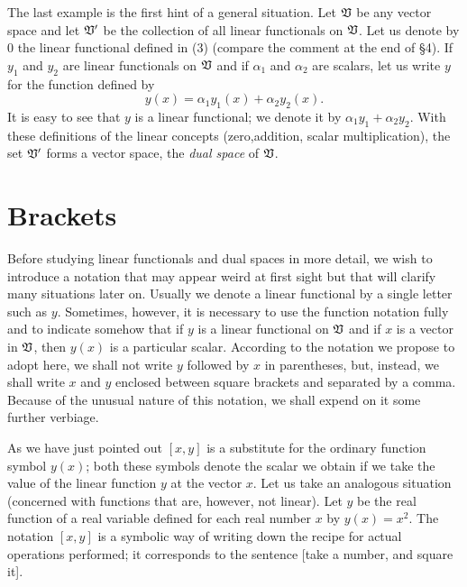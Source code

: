 The last example is the first hint of a general situation. Let \(\mathfrak{V}\) be any
vector space and let \(\mathfrak{V}'\) be the collection of all linear functionals on
\(\mathfrak{V}\). Let us denote by \(0\) the linear functional defined in (3) (compare
the comment at the end of §4). If \(y_1\) and \(y_2\) are linear functionals on
\(\mathfrak{V}\) and if \(\alpha_1\) and \(\alpha_2\) are scalars, let us write \(y\)
for the function defined by
\begin{equation*}
    y(x) = \alpha_1 y_1(x) + \alpha_2 y_2(x).
\end{equation*}
It is easy to see that \(y\) is a linear functional; we denote it by \(\alpha_1
y_1 + \alpha_2 y_2\). With these definitions of the linear concepts
(zero,addition, scalar multiplication), the set \(\mathfrak{V}'\) forms a vector space,
the \emph{dual space} of \(\mathfrak{V}\).

\section{Brackets}

Before studying linear functionals and dual spaces in more detail, we wish to
introduce a notation that may appear weird at first sight but that will clarify
many situations later on. Usually we denote a linear functional by a single
letter such as \(y\). Sometimes, however, it is necessary to use the function
notation fully and to indicate somehow that if \(y\) is a linear functional on
\(\mathfrak{V}\) and if \(x\) is a vector in \(\mathfrak{V}\), then \(y(x)\) is a particular
scalar. According to the notation we propose to adopt here, we shall not write
\(y\) followed by \(x\) in parentheses, but, instead, we shall write \(x\) and
\(y\) enclosed between square brackets and separated by a comma. Because of the
unusual nature of this notation, we shall expend on it some further verbiage.

As we have just pointed out \([x,y]\) is a substitute for the ordinary function
symbol \(y(x)\); both these symbols denote the scalar we obtain if we take the
value of the linear function \(y\) at the vector \(x\). Let us take an analogous
situation (concerned with functions that are, however, not linear). Let \(y\) be
the real function of a real variable defined for each real number \(x\) by
\(y(x) = x^2\). The notation \([x, y]\) is a symbolic way of writing down the
recipe for actual operations performed; it corresponds to the sentence [take a
number, and square it].

